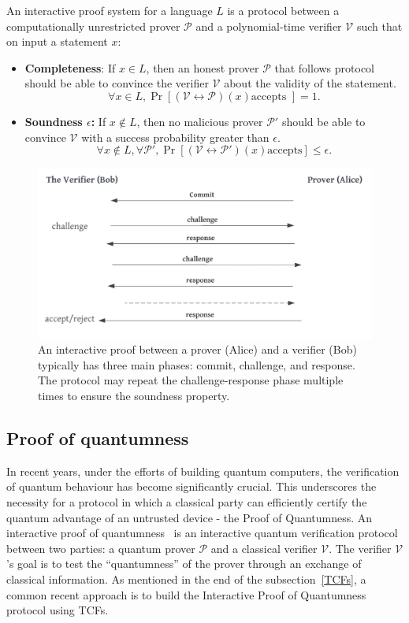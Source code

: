 \documentclass[cryptography,review,submit,pdftex,moreauthors,amsmath,amssymb,aps,strict]{Definitions/mdpi}
\begin{document}
\begin{Definition}
    An interactive proof system for a language $L$ is a protocol between a computationally unrestricted prover $\mathcal{P}$ and a polynomial-time verifier $\mathcal{V}$ such that on input a statement $x$:
    \begin{itemize}
        \item \textbf{Completeness}: If $x\in L$, then an honest prover $\mathcal{P}$ that follows protocol should be able to convince the verifier $\mathcal{V}$ about the validity of the statement. 
        $$\forall x\in L, \Pr[(\mathcal{V}\leftrightarrow \mathcal{P})(x) \text{accepts }]=1.$$
        \item \textbf{Soundness $\epsilon$:} If $x \notin L$, then no malicious prover $\mathcal{P}'$ should be able to convince $\mathcal{V}$  with a success probability greater than $\epsilon$.
        $$\forall x\notin L, \forall \mathcal{P}', \Pr[(\mathcal{V}\leftrightarrow \mathcal{P}')(x) \text{accepts}]\leq \epsilon.$$
    \end{itemize}
\end{Definition}
\begin{figure}[!htb]
	\centering
	\includegraphics[scale = 0.35]{figures/IP.pdf}
	\caption{An interactive proof between a prover (Alice) and a verifier (Bob) typically has three main phases: commit, challenge, and response. The protocol may repeat the challenge-response phase multiple times to ensure the soundness property.}\label{fig:ip}
\end{figure}

\subsection{Proof of quantumness}
In recent years, under the efforts of building quantum computers, the verification of quantum behaviour has become significantly crucial. This underscores the necessity for a protocol in which a classical party can efficiently certify the quantum advantage of an untrusted device - the Proof of Quantumness. An interactive proof of quantumness~\cite{Brakerski18_Interactiveproofofquantumness,experiment_interactive_PoQ} is an interactive quantum verification protocol between two parties: a quantum prover $\mathcal{P}$ and a classical verifier $\mathcal{V}$. The verifier $\mathcal{V}$'s goal is to test the ``quantumness'' of the prover through an exchange of classical information. As mentioned in the end of the subsection~\ref{TCFs}, a common recent approach is to build the Interactive Proof of Quantumness protocol using TCFs.
\end{document}
